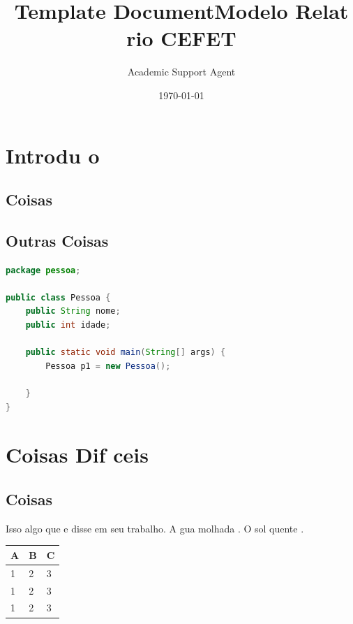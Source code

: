 \documentclass{article}
\title{Template Document}
\author{Academic Support Agent}
\date{\today}
\begin{document}
\maketitle

\title{Modelo Relat rio CEFET}
	\CEFETopen


\section{Introdu o}
\lipsum[1-2]
\subsection{Coisas}
\lipsum[1-2]

\vspace{.3cm}


\subsection{Outras Coisas}
\lipsum[1-2]

\begin{lstlisting}[language=Java, caption={},label={}]
package pessoa;

public class Pessoa {
    public String nome;
    public int idade;

    public static void main(String[] args) {
        Pessoa p1 = new Pessoa(); 
    
    }
}
\end{lstlisting}



\section{Coisas Dif ceis}
\lipsum[1]
\subsection{Coisas}

Isso   algo que \citet{Liu2007494} e \citet{law} disse em seu trabalho. A  gua   molhada \citep{1987element}. O sol   quente \citep{1987element,Liu2007494,site_sparselib}.

\lipsum[1-2]


\begin{center}
\vspace{.3cm}
\begin{tabular}{|l|l|l|}
\hline
\textbf{A}&\textbf{B}&\textbf{C}\\ \hline \hline
1&2&3\\
1&2&3\\
1&2&3\\ \hline
\end{tabular}
\vspace{.3cm}
\end{center}
\end{document}
